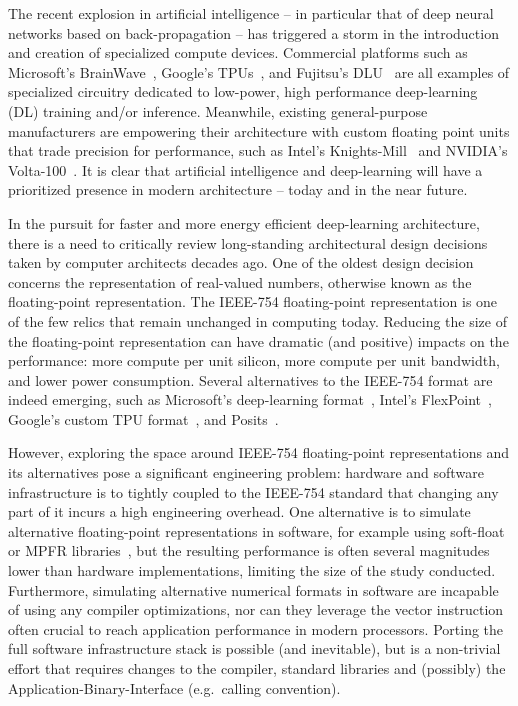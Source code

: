 \documentclass[techrep,english]{ipsj} %
\begin{document}
The recent explosion in artificial intelligence – in particular that of deep neural networks based on back-propagation – has triggered a storm in the introduction and creation of specialized compute devices.
Commercial platforms such as Microsoft’s BrainWave~\cite{msbrainwave}, Google’s TPUs~\cite{googletpu}, and Fujitsu’s DLU~\cite{fujitsudlu} are all examples of specialized circuitry dedicated to low-power, high performance deep-learning (DL) training and/or inference.
Meanwhile, existing general-purpose manufacturers are empowering their architecture with custom floating point units that trade precision for performance, such as Intel’s Knights-Mill~\cite{knm} and NVIDIA’s Volta-100~\cite{volta100}.
It is clear that artificial intelligence and deep-learning will have a prioritized presence in modern architecture -- today and in the near future.

In the pursuit for faster and more energy efficient deep-learning architecture, there is a need to critically review long-standing architectural design decisions taken by computer architects decades ago.
One of the oldest design decision concerns the representation of real-valued numbers, otherwise known as the floating-point representation.
The IEEE-754 floating-point representation is one of the few relics that remain unchanged in computing today.
Reducing the size of the floating-point representation can have dramatic (and positive) impacts on the performance: more compute per unit silicon, more compute per unit bandwidth, and lower power consumption.
Several alternatives to the IEEE-754 format are indeed emerging, such as Microsoft’s deep-learning format~\cite{msbrainwave}, Intel’s FlexPoint~\cite{intelflexpoint}, Google’s custom TPU format~\cite{tpuformat}, and Posits~\cite{posits}.

However, exploring the space around IEEE-754 floating-point representations and its alternatives pose a significant engineering problem: hardware and software infrastructure is to tightly coupled to the IEEE-754 standard that changing any part of it incurs a high engineering overhead.
One alternative is to simulate alternative floating-point representations in software, for example using soft-float or MPFR libraries~\cite{softfloat}, but the resulting performance is often several magnitudes lower than hardware implementations, limiting the size of the study conducted.
Furthermore, simulating alternative numerical formats in software are incapable of using any compiler optimizations, nor can they leverage the vector instruction often crucial to reach application performance in modern processors.
Porting the full software infrastructure stack is possible (and inevitable), but is a non-trivial effort that requires changes to the compiler, standard libraries and (possibly) the Application-Binary-Interface (e.g.\ calling convention).
\end{document}
